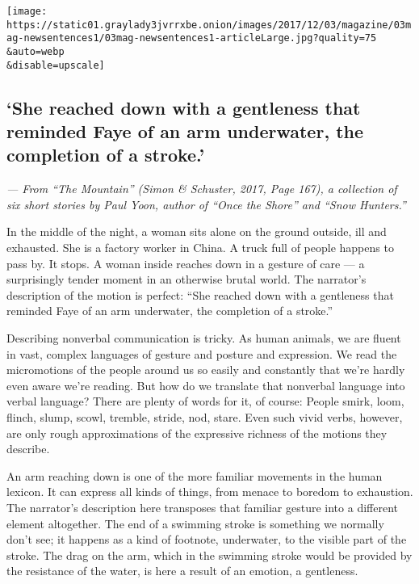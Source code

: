 \texttt{[image: https://static01.graylady3jvrrxbe.onion/images/2017/12/03/magazine/03mag-newsentences1/03mag-newsentences1-articleLarge.jpg?quality=75\\\&auto=webp\\\&disable=upscale]}

\hypertarget{she-reached-down-with-a-gentleness-that-reminded-faye-of-an-arm-underwater-the-completion-of-a-stroke}{%
\subsection{`She reached down with a gentleness that reminded Faye of an
arm underwater, the completion of a
stroke.'}\label{she-reached-down-with-a-gentleness-that-reminded-faye-of-an-arm-underwater-the-completion-of-a-stroke}}

\emph{--- From ``The Mountain'' (Simon \& Schuster, 2017, Page 167), a
collection of six short stories by Paul Yoon, author of ``Once the
Shore'' and ``Snow Hunters.''}

In the middle of the night, a woman sits alone on the ground outside,
ill and exhausted. She is a factory worker in China. A truck full of
people happens to pass by. It stops. A woman inside reaches down in a
gesture of care --- a surprisingly tender moment in an otherwise brutal
world. The narrator's description of the motion is perfect: ``She
reached down with a gentleness that reminded Faye of an arm underwater,
the completion of a stroke.''

Describing nonverbal communication is tricky. As human animals, we are
fluent in vast, complex languages of gesture and posture and expression.
We read the micromotions of the people around us so easily and
constantly that we're hardly even aware we're reading. But how do we
translate that nonverbal language into verbal language? There are plenty
of words for it, of course: People smirk, loom, flinch, slump, scowl,
tremble, stride, nod, stare. Even such vivid verbs, however, are only
rough approximations of the expressive richness of the motions they
describe.

An arm reaching down is one of the more familiar movements in the human
lexicon. It can express all kinds of things, from menace to boredom to
exhaustion. The narrator's description here transposes that familiar
gesture into a different element altogether. The end of a swimming
stroke is something we normally don't see; it happens as a kind of
footnote, underwater, to the visible part of the stroke. The drag on the
arm, which in the swimming stroke would be provided by the resistance of
the water, is here a result of an emotion, a gentleness.

